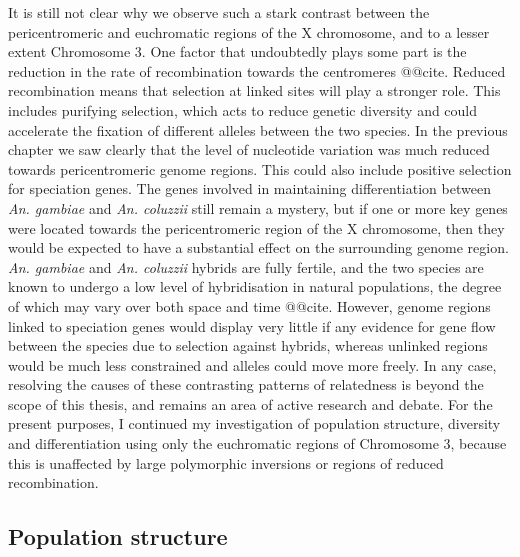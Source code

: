 \documentclass[a4paper,11pt,abstracton,hidelinks]{scrartcl}
\begin{document}
It is still not clear why we observe such a stark contrast between the pericentromeric and euchromatic regions of the X chromosome, and to a lesser extent Chromosome 3.
%
One factor that undoubtedly plays some part is the reduction in the rate of recombination towards the centromeres @@cite.
%
Reduced recombination means that selection at linked sites will play a stronger role.
%
This includes purifying selection, which acts to reduce genetic diversity and could accelerate the fixation of different alleles between the two species.
%
In the previous chapter we saw clearly that the level of nucleotide variation was much reduced towards pericentromeric genome regions.
%
This could also include positive selection for speciation genes.
%
The genes involved in maintaining differentiation between \textit{An. gambiae} and \textit{An. coluzzii} still remain a mystery, but if one or more key genes were located towards the pericentromeric region of the X chromosome, then they would be expected to have a substantial effect on the surrounding genome region.
%
\textit{An. gambiae} and \textit{An. coluzzii} hybrids are fully fertile, and the two species are known to undergo a low level of hybridisation in natural populations, the degree of which may vary over both space and time @@cite.
%
However, genome regions linked to speciation genes would display very little if any evidence for gene flow between the species due to selection against hybrids, whereas unlinked regions would be much less constrained and alleles could move more freely.
%
In any case, resolving the causes of these contrasting patterns of relatedness is beyond the scope of this thesis, and remains an area of active research and debate.
%
For the present purposes, I continued my investigation of population structure, diversity and differentiation using only the euchromatic regions of Chromosome 3, because this is unaffected by large polymorphic inversions or regions of reduced recombination.


\subsection{Population structure}\label{subsec:pop-structure}
\end{document}
